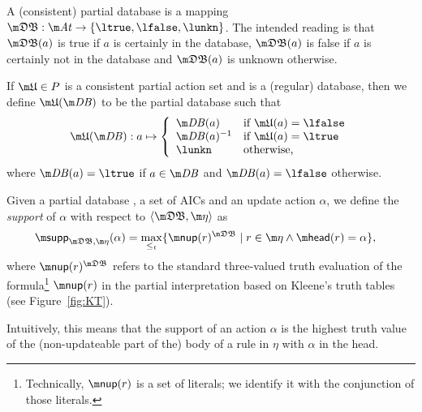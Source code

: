 A (consistent) partial database is a mapping $\tdb: \atoms \to \{\ltrue,\lfalse,\lunkn\}$.
The intended reading is that $\tdb(a)$ is true if $a$ is certainly in the database, $\tdb(a)$ is false if $a$ is certainly not in the database and $\tdb(a)$ is unknown otherwise. 

If $\UUU \in P$ is a consistent partial action set and \db is a (regular) database, then we define $\UUU(\db)$ to be the partial database such that 
\[ \UUU(\db): a \mapsto \left \{\begin{array}{ll}
                                 \db(a) & \text{if }\UUU(a) = \lfalse\\
                                 \db(a)^{-1} & \text{if }\UUU(a) = \ltrue\\
                                 \lunkn & \text{otherwise,}
                                \end{array}\right.
                                \]
where $\db(a) = \ltrue$ if $a\in \db$ and $\db(a)=\lfalse$ otherwise. 



\begin{definition}\label{def:support}
Given a partial database \tdb, a set of AICs \aics and an update action $\alpha$,  we define the \emph{support} of $\alpha$ with respect to $\langle \tdb, \aics\rangle$ as 
\begin{align*}
 \supp_{\tdb,\aics}(\alpha) &= \max_{\leq_t}\{\nup(r)^{\tdb}\mid r\in \aics \land \head(r) = \alpha\},
\end{align*}
where $\nup(r)^{\tdb}$ refers to the standard three-valued truth evaluation of the formula\footnote{Technically, $\nup(r)$ is a set of literals; we identify it with the conjunction of those literals.} $\nup(r)$ in the partial interpretation \tdb based on Kleene's truth tables \cite{Kleene38} (see Figure~\ref{fig:KT}).
\end{definition}
Intuitively, this means that the support of an action $\alpha$ is the highest truth value of the (non-updateable part of the) body of a rule in $\eta$ with $\alpha$ in the head. 



